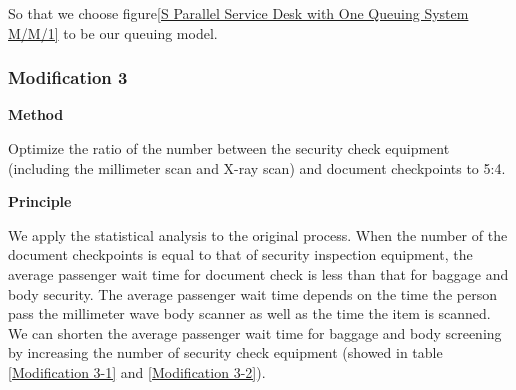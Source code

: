 \documentclass{mcmthesis}
\begin{document}
\par So that we choose figure\ref{S Parallel Service Desk with One Queuing System M/M/1} to be our queuing model.


\subsubsection*{Modification 3}
\par \textbf{Method}
\par Optimize the ratio of the number between the security check equipment (including the millimeter scan and X-ray scan) and document checkpoints to 5:4.
\par \textbf{Principle}
\par We apply the statistical analysis to the original process. When the number of the document checkpoints is equal to that of security inspection equipment, the average passenger wait time for document check is less than that for baggage and body security. The average passenger wait time depends on the time the person pass the millimeter wave body scanner as well as the time the item is scanned. We can shorten the average passenger wait time for baggage and body screening by increasing the number of security check equipment (showed in table \ref{Modification 3-1} and \ref{Modification 3-2}).
\end{document}
